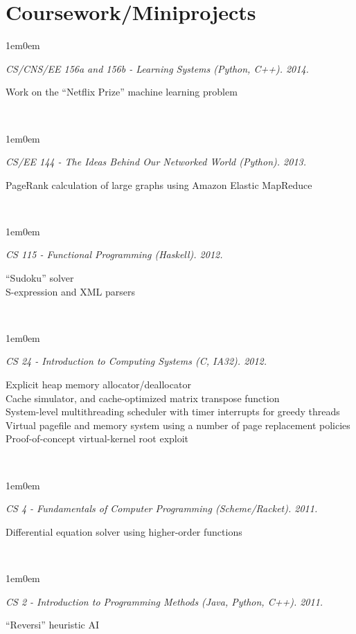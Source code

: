 \documentclass[10pt,letterpaper, full]{article}
\newcommand{\pjtitle}[1]{\renewcommand{\givenpjtitle}{#1}}
\newcommand{\pjtime}[1]{\renewcommand{\givenpjtime}{#1}}
\newcommand{\pjbody}[1]{\renewcommand{\givenpjbody}{#1}}
\newcommand{\givenpjtitle}{REQUIRED!}
\newcommand{\givenpjtime}{REQUIRED!}
\newcommand{\givenpjbody}{REQUIRED!}
\newenvironment{projectenv}
    {
        \begin{adjustwidth}{1em}{0em}
    }
    {
        \textit{\givenpjtitle. \givenpjtime.}

        \begin{minipage}[l]{\textwidth}
            \givenpjbody%
        \end{minipage}\\%


        \end{adjustwidth}
    }
\begin{document}
\section{Coursework/Miniprojects}

\begin{projectenv}%
    \pjtitle{CS/CNS/EE 156a and 156b - Learning Systems (Python, C++)}
    \pjtime{2014}
    \pjbody{
        Work on the “Netflix Prize” machine learning problem
    }
\end{projectenv}%

\begin{projectenv}%
    \pjtitle{CS/EE 144 - The Ideas Behind Our Networked World (Python)}
    \pjtime{2013}
    \pjbody{
        PageRank calculation of large graphs using Amazon Elastic MapReduce\\
    }
\end{projectenv}%

\begin{projectenv}%
    \pjtitle{CS 115 - Functional Programming (Haskell)}
    \pjtime{2012}
    \pjbody{
        “Sudoku” solver\\
        S-expression and XML parsers\\
    }
\end{projectenv}%

\begin{projectenv}%
    \pjtitle{CS 24 - Introduction to Computing Systems (C, IA32)}
    \pjtime{2012}
    \pjbody{
    Explicit heap memory allocator/deallocator\\
    Cache simulator, and cache-optimized matrix transpose function\\
    System-level multithreading scheduler with timer interrupts for greedy threads\\
    Virtual pagefile and memory system using a number of page replacement policies\\
    Proof-of-concept virtual-kernel root exploit\\
    }
\end{projectenv}%

\begin{projectenv}%
    \pjtitle{CS 4 - Fundamentals of Computer Programming (Scheme/Racket)}
    \pjtime{2011}
    \pjbody{
        Differential equation solver using higher-order functions
    }
\end{projectenv}%

\begin{projectenv}%
    \pjtitle{CS 2 - Introduction to Programming Methods (Java, Python, C++)}
    \pjtime{2011}
    \pjbody{
        “Reversi” heuristic AI
    }
\end{projectenv}%
\end{document}
